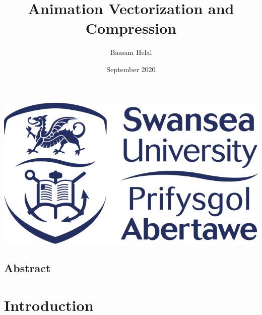\documentclass[12pt]{article}
\title{Animation Vectorization and Compression}
\author{Bassam Helal}
\date{ September 2020 }
\begin{document}
    \pagecolor{black}
    \color{white}


    \maketitle

    \begin{center}
        \vspace{8cm}
        \includegraphics[scale=0.65]{SwanseaUniversityLogo.png}
    \end{center}

    \pagebreak

    \begin{center}
        \section*{Abstract}
    \end{center}


    \pagebreak

    \renewcommand*\contentsname{
    \begin{center}
        Table of Contents
    \end{center}}

    \tableofcontents

    \pagebreak



    \section{Introduction}\label{sec:introduction}
\end{document}
